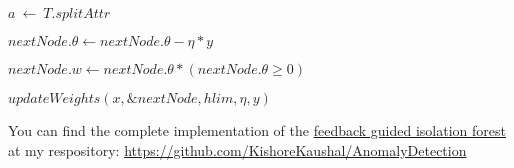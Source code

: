 \vspace{1em}
\begin{algorithm}[H]
    \caption{$updateWeights(x, T, hlim, \eta, y)$}\label{alg:updateWeights}
    \DontPrintSemicolon
    \SetAlgoLined


    $a \: \leftarrow \: T.splitAttr$



    $nextNode.\theta \leftarrow nextNode.\theta - \eta * y$

    $nextNode.w \leftarrow nextNode.\theta * (nextNode.\theta \geq 0)$

    $updateWeights(x, \&nextNode, hlim, \eta, y)$
\end{algorithm}
\vspace{2em}

You can find the complete implementation of the  \href{https://github.com/KishoreKaushal/AnomalyDetection/blob/master/isolationforest/FeedbackIsolationForest.py}{feedback guided isolation forest} at my respository: \url{https://github.com/KishoreKaushal/AnomalyDetection}